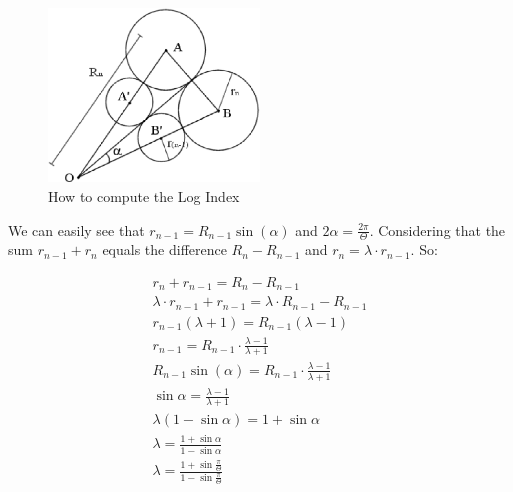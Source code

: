\documentclass{article}
\begin{document}
\begin{figure}[htb]
	\centering
		\includegraphics[width=0.50\textwidth]{Image1.eps}
	\caption{How to compute the Log Index}
	\label{fig:Image1}
\end{figure}


We can easily see that $r_{n-1}=R_{n-1}\sin(\alpha)$ and $2\alpha = \frac{2\pi}{\Theta}$. Considering that the sum $r_{n-1}+r_{n}$ equals the difference $R_{n}-R_{n-1}$ and $r_{n}=\lambda\cdot r_{n-1}$. So:


\begin{eqnarray}
	r_{n}+r_{n-1}=R_{n}-R_{n-1}\\
	\lambda\cdot r_{n-1}+r_{n-1}=\lambda\cdot R_{n-1}-R_{n-1}\\
	r_{n-1}\left(\lambda+1\right)=R_{n-1}\left(\lambda-1\right)\\
	r_{n-1}=R_{n-1}\cdot\frac{\lambda-1}{\lambda+1}\\
	R_{n-1}\sin(\alpha)=R_{n-1}\cdot\frac{\lambda-1}{\lambda+1}\\
	\sin\alpha=\frac{\lambda-1}{\lambda+1}\\
	\lambda(1-\sin\alpha)=1+\sin\alpha\\
	\lambda = \frac{1+\sin\alpha}{1-\sin\alpha}\\
	\lambda = \frac{1+\sin\frac{\pi}{\Theta}}{1-\sin\frac{\pi}{\Theta}}
\end{eqnarray}

\end{document}
